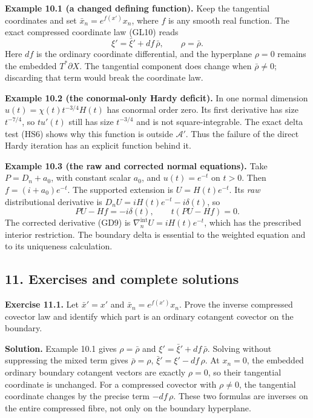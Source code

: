 \documentclass[
  11pt,
]{article}
\makeatletter
\let\ReaderOriginalAnchorStart\hyper@anchorstart
\let\ReaderOriginalAnchorEnd\hyper@anchorend
\let\ReaderPendingAliases\@empty
\def\ReaderArmAliases#1{\gdef\ReaderPendingAliases{#1}}
\def\hyper@anchorstart#1{\ReaderIfNativeAnchorTF{#1}{\ReaderPendingAliases\global\let\ReaderPendingAliases\@empty}{}\ReaderOriginalAnchorStart{#1}}
\makeatother
\begin{document}
\textbf{Example 10.1 (a changed defining function).} Keep the tangential
coordinates and set \(\bar x_n=e^{f(x')}x_n\), where \(f\) is any smooth
real function. The exact compressed coordinate law (GL10) reads \[
 \xi'=\bar\xi'+df\,\bar\rho,
 \qquad \rho=\bar\rho.
\] Here \(df\) is the ordinary coordinate differential, and the
hyperplane \(\rho=0\) remains the embedded \(T^*\partial X\). The
tangential component does change when \(\bar\rho\ne0\); discarding that
term would break the coordinate law.

\textbf{Example 10.2 (the conormal-only Hardy deficit).} In one normal
dimension \(u(t)=\chi(t)t^{-3/4}H(t)\) has conormal order zero. Its
first derivative has size \(t^{-7/4}\), so \(t u'(t)\) still has size
\(t^{-3/4}\) and is not square-integrable. The exact delta test (HS6)
shows why this function is outside \(\mathcal A'\). Thus the failure of
the direct Hardy iteration has an explicit function behind it.

\textbf{Example 10.3 (the raw and corrected normal equations).} Take
\(P=D_n+a_0\), with constant scalar \(a_0\), and \(u(t)=e^{-t}\) on
\(t>0\). Then \(f=(i+a_0)e^{-t}\). The supported extension is
\(U=H(t)e^{-t}\). Its \emph{raw} distributional derivative is
\(D_nU=iH(t)e^{-t}-i\delta(t)\), so \[
 PU-Hf=-i\delta(t),\qquad t(PU-Hf)=0.
\] The corrected derivative (GD9) is
\(\nabla_n^{\mathrm{int}}U=iH(t)e^{-t}\), which has the prescribed
interior restriction. The boundary delta is essential to the weighted
equation and to its uniqueness calculation.

\ReaderArmAliases{\ReaderOriginalAnchorStart{AN03-GBD-011}\ReaderOriginalAnchorEnd\begingroup\expandafter\def\csname @currentHref\endcsname{AN03-GBD-011}\label{AN03-GBD-011}\endgroup\ReaderOriginalAnchorStart{11-exercises-and-complete-solutions}\ReaderOriginalAnchorEnd\begingroup\expandafter\def\csname @currentHref\endcsname{11-exercises-and-complete-solutions}\label{11-exercises-and-complete-solutions}\endgroup}
\subsection{11. Exercises and complete
solutions}\label{exercises-and-complete-solutions}

\textbf{Exercise 11.1.} Let \(\bar x'=x'\) and
\(\bar x_n=e^{f(x')}x_n\). Prove the inverse compressed covector law and
identify which part is an ordinary cotangent covector on the boundary.

\textbf{Solution.} Example 10.1 gives \(\rho=\bar\rho\) and
\(\xi'=\bar\xi'+df\,\bar\rho\). Solving without suppressing the mixed
term gives \(\bar\rho=\rho\), \(\bar\xi'=\xi'-df\,\rho\). At \(x_n=0\),
the embedded ordinary boundary cotangent vectors are exactly \(\rho=0\),
so their tangential coordinate is unchanged. For a compressed covector
with \(\rho\ne0\), the tangential coordinate changes by the precise term
\(-df\,\rho\). These two formulas are inverses on the entire compressed
fibre, not only on the boundary hyperplane.
\end{document}
